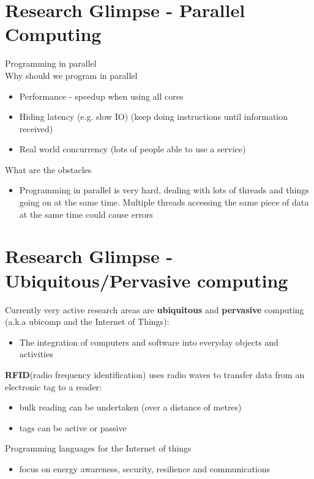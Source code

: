 \documentclass{article}[18pt]
\begin{document}
\section{Research Glimpse - Parallel Computing}
Programming in parallel\\
Why should we program in parallel
\begin{itemize}
\item Performance - speedup when using all cores
\item Hiding latency (e.g. slow IO) (keep doing instructions until information received)
\item Real world concurrency (lots of people able to use a service)
\end{itemize}
What are the obstacles
\begin{itemize}
\item Programming in parallel is very hard, dealing with lots of threads and things going on at the same time. Multiple threads accessing the same piece of data at the same time could cause errors
\end{itemize}
\section{Research Glimpse - Ubiquitous/Pervasive computing}
Currently very active research areas are \textbf{ubiquitous} and \textbf{pervasive} computing (a.k.a ubicomp and the Internet of Things):
\begin{itemize}
\item The integration of computers and software into everyday objects and activities
\end{itemize}
\textbf{RFID}(radio frequency identification) uses radio waves to transfer data from an electronic tag to a reader:
\begin{itemize}
\item bulk reading can be undertaken (over a distance of metres)
\item tags can be active or passive
\end{itemize}
Programming languages for the Internet of things
\begin{itemize}
\item focus on energy awareness, security, resilience and communications
\end{itemize}
\end{document}
